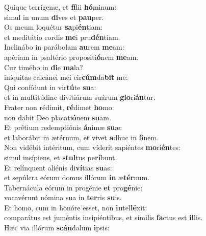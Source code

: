 \evenverse Quique terrígenæ, et \textbf{fí}lii \textbf{hó}minum:~\*\\
\evenverse simul in unum \textbf{di}ves et \textbf{pau}per.\\
\oddverse Os meum loquétur \textbf{sa}pi\textbf{én}tiam:~\*\\
\oddverse et meditátio cordis \textbf{me}i pru\textbf{dén}tiam.\\
\evenverse Inclinábo in parábolam \textbf{au}rem \textbf{me}am:~\*\\
\evenverse apériam in psaltério propositi\textbf{ó}nem \textbf{me}am.\\
\oddverse Cur timébo in \textbf{di}e \textbf{ma}la?~\*\\
\oddverse iníquitas calcánei mei cir\textbf{cúm}da\textbf{bit} me:\\
\evenverse Qui confídunt in vir\textbf{tú}te \textbf{su}a:~\*\\
\evenverse et in multitúdine divitiárum suárum \textbf{glo}ri\textbf{án}tur.\\
\oddverse Frater non rédimit, \textbf{ré}dimet \textbf{ho}mo:~\*\\
\oddverse non dabit Deo placati\textbf{ó}nem \textbf{su}am.\\
\evenverse Et prétium redemptiónis \textbf{á}nimæ \textbf{su}æ:~\*\\
\evenverse et laborábit in ætérnum, et vivet \textbf{a}dhuc in \textbf{fi}nem.\\
\oddverse Non vidébit intéritum, cum víderit sapiéntes \textbf{mo}ri\textbf{én}tes:~\*\\
\oddverse simul insípiens, et \textbf{stul}tus pe\textbf{rí}bunt.\\
\evenverse Et relínquent aliénis di\textbf{ví}tias \textbf{su}as:~\*\\
\evenverse et sepúlcra eórum domus illórum \textbf{in} æ\textbf{tér}num.\\
\oddverse Tabernácula eórum in progénie \textbf{et} pro\textbf{gé}nie:~\*\\
\oddverse vocavérunt nómina sua in \textbf{ter}ris \textbf{su}is.\\
\evenverse Et homo, cum in honóre esset, non \textbf{in}tel\textbf{lé}xit:~\*\\
\evenverse comparátus est juméntis insipiéntibus, et símilis \textbf{fa}ctus est \textbf{il}lis.\\
\oddverse Hæc via illórum \textbf{scán}dalum \textbf{i}psis:~\*\\
